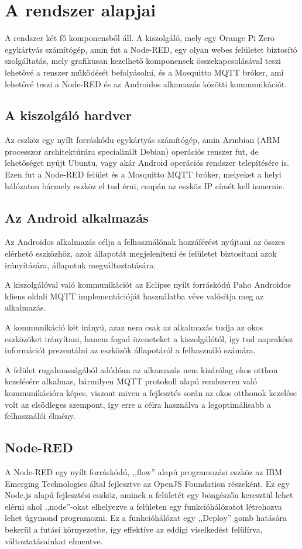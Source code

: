 \documentclass[
]{thesis-ekf}
\theoremstyle{definition}
\theoremstyle{remark}
\begin{document}
\chapter{A rendszer alapjai}
A rendszer két fő komponensből áll. A kiszolgáló, mely egy Orange Pi Zero egykártyás számítógép, amin fut a Node-RED, egy olyan webes felületet biztosító szolgáltatás, mely grafikusan kezelhető komponensek összekapcsolásával teszi lehetővé a renszer működését befolyásolni, és a Mosquitto MQTT bróker, ami lehetővé teszi a Node-RED\cite{nodeRed} és az Androidos alkamazás közötti kommunikációt.

\section{A kiszolgáló hardver}
Az eszköz egy nyílt forráskódu egykártyás számítógép, amin Armbian\cite{armbian} (ARM processzor architektúrára specializált Debian) operációs renszer fut, 
de lehetőséget nyújt Ubuntu, vagy akár Android operációs rendszer telepítésére is. Ezen fut a Node-RED felület és a Mosquitto MQTT bróker, 
melyeket a helyi hálózaton bármely eszköz el tud érni, csupán az eszköz IP címét kell ismernie.

\section{Az Android alkalmazás}
Az Androidos alkalmazás célja a felhasználónak hozzáférést nyújtani az összes elérhető eszközhöz, 
azok állapotát megjeleníteni és felületet biztosítani azok irányítására, állapotuk megváltoztatására. 

A kiszolgálóval való kommunikációt az Eclipse nyílt forráskódú Paho\cite{paho} Androidos kliens oldali MQTT implementációját használatba véve valósítja meg az alkalmazás. 

A kommunikáció két irányú, azaz nem csak az alkalmazás tudja az okos eszközöket irányítani, 
hanem fogad üzeneteket a kiszolgálótól, így tud naprakész információt prezentálni az eszközök állapotáról a felhasználó számára.

A felület rugalmasságából adódóan az alkamazás nem kizárólag okos otthon kezelésére alkalmas, bármilyen MQTT protokoll alapú rendszeren való kommunikációra képes,
viszont miven a fejlesztés során az okos otthonok kezelése volt az elsődleges szempont, így erre a célra használva a legoptimálisabb a felhasználói élmény.

\section{Node-RED}
A Node-RED egy nyílt forráskódú, ,,flow'' alapú programozási eszköz az IBM Emerging Technologies\cite{ibmET} által fejlesztve az OpenJS Foundation\cite{openjs} részeként. 
Ez egy Node.js alapú fejlesztési eszköz, aminek a felületét egy böngészőn keresztül lehet elérni ahol ,,node''-okat elhelyezve a felületen  egy funkcióhálózatot létrehozva lehet úgymond programozni. 
Ez a funkcióhálózat egy ,,Deploy'' gomb hatására bekerül a futási környezetbe, így effektíve az eddigi viselkedést felülírva, változtatásainkat elmentve.
\end{document}
